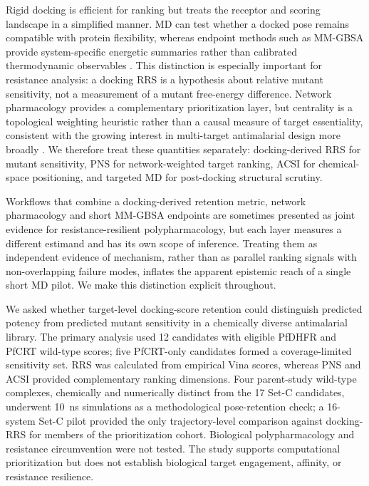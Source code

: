 \documentclass[journal=jcisd8,manuscript=article,layout=traditional]{achemso}
\begin{document}
Rigid docking is efficient for ranking but treats the receptor and scoring landscape in a simplified manner. MD can test whether a docked pose remains compatible with protein flexibility, whereas endpoint methods such as MM-GBSA provide system-specific energetic summaries rather than calibrated thermodynamic observables \citep{gmx_mmpbsa_2021,wang2019_mmgbsa}. This distinction is especially important for resistance analysis: a docking RRS is a hypothesis about relative mutant sensitivity, not a measurement of a mutant free-energy difference. Network pharmacology provides a complementary prioritization layer, but centrality is a topological weighting heuristic rather than a causal measure of target essentiality, consistent with the growing interest in multi-target antimalarial design more broadly \citep{multi_target_antimalarials_2025}. We therefore treat these quantities separately: docking-derived RRS for mutant sensitivity, PNS for network-weighted target ranking, ACSI for chemical-space positioning, and targeted MD for post-docking structural scrutiny.

Workflows that combine a docking-derived retention metric, network pharmacology and short MM-GBSA endpoints are sometimes presented as joint evidence for resistance-resilient polypharmacology, but each layer measures a different estimand and has its own scope of inference. Treating them as independent evidence of mechanism, rather than as parallel ranking signals with non-overlapping failure modes, inflates the apparent epistemic reach of a single short MD pilot. We make this distinction explicit throughout.

We asked whether target-level docking-score retention could distinguish predicted potency from predicted mutant sensitivity in a chemically diverse antimalarial library. The primary analysis used \num{12} candidates with eligible PfDHFR and PfCRT wild-type scores; five PfCRT-only candidates formed a coverage-limited sensitivity set. RRS was calculated from empirical Vina scores, whereas PNS and ACSI provided complementary ranking dimensions. Four parent-study wild-type complexes, chemically and numerically distinct from the 17 Set-C candidates, underwent \qty{10}{\nano\second} simulations as a methodological pose-retention check; a 16-system Set-C pilot provided the only trajectory-level comparison against docking-RRS for members of the prioritization cohort. Biological polypharmacology and resistance circumvention were not tested. The study supports computational prioritization but does not establish biological target engagement, affinity, or resistance resilience.
\end{document}
